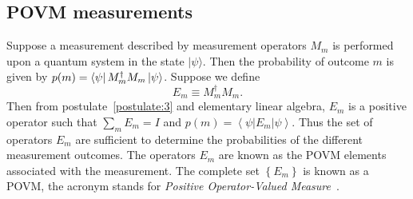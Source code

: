 \subsection{POVM measurements}
Suppose a measurement described by measurement operators $M_{m}$ is performed upon a quantum system in the state $|\psi\rangle$. Then the probability of outcome $m$ is given by $p(m)=\bra{\psi}M_{m}^{\dagger} M_{m}\ket{\psi}$. Suppose we define
\begin{equation}
E_{m} \equiv M_{m}^{\dagger} M_{m}.
\end{equation}
Then from postulate~\ref{postulate:3} and elementary linear algebra, $E_{m}$ is a positive operator such that $\sum_{m} E_{m}=I$ and $p(m)=\left\langle\psi\left|E_{m}\right| \psi\right\rangle$. Thus the set of operators $E_{m}$ are sufficient to determine the probabilities of the different measurement outcomes. The operators $E_{m}$ are known as the POVM elements associated with the measurement. The complete set $\left\{E_{m}\right\}$ is known as a POVM, the acronym stands for \emph{Positive Operator-Valued Measure}~\cite{NielsenChuang}.
